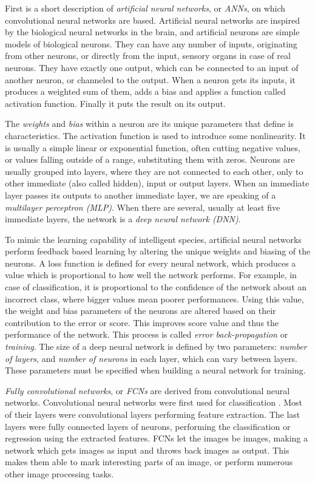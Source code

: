 \documentclass[12pt]{report}
\begin{document}
First is a short description of \textit{artificial neural networks}, or \textit{ANNs}, on which convolutional neural networks are based. Artificial neural networks are inspired by the biological neural networks in the brain, and artificial neurons are simple models of biological neurons. They can have any number of inputs, originating from other neurons, or directly from the input, sensory organs in case of real neurons. They have exactly one output, which can be connected to an input of another neuron, or channeled to the output. When a neuron gets its inputs, it produces a weighted sum of them, adds a bias and applies a function called activation function. Finally it puts the result on its output.

The \textit{weights} and \textit{bias} within a neuron are its unique parameters that define is characteristics. The activation function is used to introduce some nonlinearity. It is usually a simple linear or exponential function, often cutting negative values, or values falling outside of a range, substituting them with zeros. Neurons are usually grouped into layers, where they are not connected to each other, only to other immediate (also called hidden), input or output layers. When an immediate layer passes its outputs to another immediate layer, we are speaking of a \textit{multilayer perceptron (MLP)}. When there are several, usually at least five immediate layers, the network is a \textit{deep neural network (DNN)}.

To mimic the learning capability of intelligent species, artificial neural networks perform feedback based learning by altering the unique weights and biasing of the neurons. A loss function is defined for every neural network, which produces a value which is proportional to how well the network performs. For example, in case of classification, it is proportional to the confidence of the network about an incorrect class, where bigger values mean poorer performances. Using this value, the weight and bias parameters of the neurons are altered based on their contribution to the error or score. This improves score value and thus the performance of the network. This process is called \textit{error back-propagation} or \textit{training}. The size of a deep neural network is defined by two parameters: \textit{number of layers}, and \textit{number of neurons} in each layer, which can vary between layers. These parameters must be specified when building a neural network for training.

\textit{Fully convolutional networks}, or \textit{FCNs} are derived from convolutional neural networks. Convolutional neural networks were first used for classification \cite{applications}. Most of their layers were convolutional layers performing feature extraction. The last layers were fully connected layers of neurons, performing the classification or regression using the extracted features. FCNs let the images be images, making a network which gets images as input and throws back images as output. This makes them able to mark interesting parts of an image, or perform numerous other image processing tasks.
\end{document}
